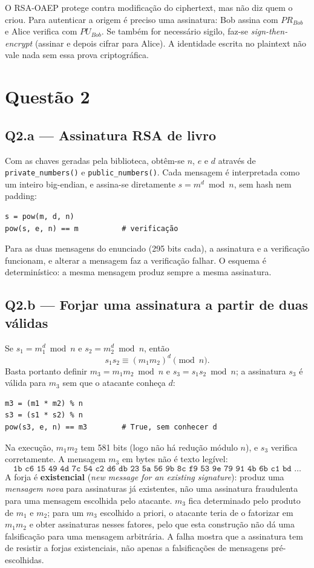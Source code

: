 \documentclass[11pt,a4paper]{article}
\begin{document}
O RSA-OAEP protege contra modificação do ciphertext, mas não diz quem o
criou. Para autenticar a origem é preciso uma assinatura: Bob assina com
$PR_{Bob}$ e Alice verifica com $PU_{Bob}$. Se também for necessário sigilo,
faz-se \emph{sign-then-encrypt} (assinar e depois cifrar para Alice). A
identidade escrita no plaintext não vale nada sem essa prova criptográfica.

\section*{Questão 2}

\subsection*{Q2.a --- Assinatura RSA de livro}

Com as chaves geradas pela biblioteca, obtêm-se $n$, $e$ e $d$ através de
\texttt{private\_numbers()} e \texttt{public\_numbers()}. Cada mensagem é
interpretada como um inteiro big-endian, e assina-se diretamente
$s = m^d \bmod n$, sem hash nem padding:

\begin{verbatim}
s = pow(m, d, n)
pow(s, e, n) == m          # verificação
\end{verbatim}

Para as duas mensagens do enunciado (295 bits cada), a assinatura e a
verificação funcionam, e alterar a mensagem faz a verificação falhar. O
esquema é determinístico: a mesma mensagem produz sempre a mesma assinatura.

\subsection*{Q2.b --- Forjar uma assinatura a partir de duas válidas}

Se $s_1 = m_1^d \bmod n$ e $s_2 = m_2^d \bmod n$, então
\[
s_1 s_2 \equiv (m_1 m_2)^d \pmod n .
\]
Basta portanto definir $m_3 = m_1 m_2 \bmod n$ e
$s_3 = s_1 s_2 \bmod n$; a assinatura $s_3$ é válida para $m_3$ sem que o
atacante conheça $d$:

\begin{verbatim}
m3 = (m1 * m2) % n
s3 = (s1 * s2) % n
pow(s3, e, n) == m3        # True, sem conhecer d
\end{verbatim}

Na execução, $m_1 m_2$ tem 581 bits (logo não há redução módulo $n$), e
$s_3$ verifica corretamente. A mensagem $m_3$ em bytes não é texto legível:
\[
\texttt{1b c6 15 49 4d 7c 54 c2 d6 db 23 5a 56 9b 8c f9 53 9e 79 91 4b 6b c1 bd \ldots}
\]
A forja é \textbf{existencial} (\emph{new message for an existing
signature}): produz uma \emph{mensagem nova} para assinaturas já existentes,
não uma assinatura fraudulenta para uma mensagem escolhida pelo atacante.
$m_3$ fica determinado pelo produto de $m_1$ e $m_2$; para um $m_3$ escolhido
a priori, o atacante teria de o fatorizar em $m_1 m_2$ e obter assinaturas
nesses fatores, pelo que esta construção não dá uma falsificação para uma
mensagem arbitrária. A falha mostra que a assinatura tem de resistir a forjas
existenciais, não apenas a falsificações de mensagens pré-escolhidas.
\end{document}
